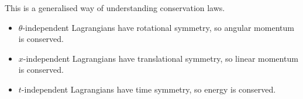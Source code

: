 This is a generalised way of understanding conservation laws.
\begin{itemize}
    \item $\theta$-independent Lagrangians have rotational symmetry, so
        angular momentum is conserved.
    \item $x$-independent Lagrangians have translational symmetry, so linear
        momentum is conserved.
    \item $t$-independent Lagrangians have time symmetry, so energy is conserved.
\end{itemize}
